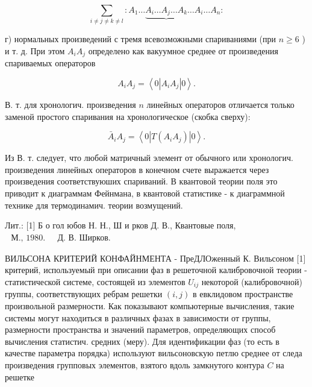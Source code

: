 \documentclass[10pt]{article}
\begin{document}
\[

\sum_{i \neq j \neq k \neq l}: A_{1} \ldots \underbrace{A_{i} \ldots A_{j} \ldots A_{k}} \ldots A_{i} \ldots A_{n}:

\]



г) нормальных произведений с тремя всевозможными спариваниями (при $n \geqslant 6$ ) и т. д. При этом $A_{i} A_{j}$ определено как вакуумное среднее от произведения спариваемых операторов



\[

A_{i} A_{j}=\left\langle 0\left|A_{i} A_{j}\right| 0\right\rangle .

\]



В. т. для хронологич. произведения $n$ линейных операторов отличается только заменой простого спаривания на хронологическое (скобка сверху):



\[

\bar{A}_{i} A_{j}=\left\langle 0\left|T\left(A_{i} A_{j}\right)\right| 0\right\rangle .

\]



Из В. т. следует, что любой матричный элемент от обычного или хронологич. произведения линейных операторов в конечном счете выражается через произведения соответствуюших спариваний. В квантовой теории поля это приводит к диаграммам Фейнмана, в квантовой статистике - к диаграммной технике для термодинамич. теории возмущений.



Лит.: [1] Б о гол юбов Н. Н., Ш и рков Д. В., Квантовые поля, $\begin{array}{ll}\text { М., 1980. } & \text { Д. В. Ширков. }\end{array}$



ВИЛЬСОНА КРИТЕРИЙ КОНФАЙНМЕНТА - ПреДЛОженный К. Вильсоном [1] критерий, используемый при описании фаз в решеточной калибровочной теории - статистической системе, состоящей из элементов $U_{i j}$ некоторой (калибровочной) группы, соответствующих ребрам решетки $(i, j)$ в евклидовом пространстве произвольной размерности. Как показывают компьютерные вычисления, такие системы могут находиться в различных фазах в зависимости от группы, размерности пространства и значений параметров, определяющих способ вычисления статистич. средних (меру). Для идентификации фаз (то есть в качестве параметра порядка) используют вильсоновскую петлю среднее от следа произведения групповых элементов, взятого вдоль замкнутого контура $C$ на решетке
\end{document}
